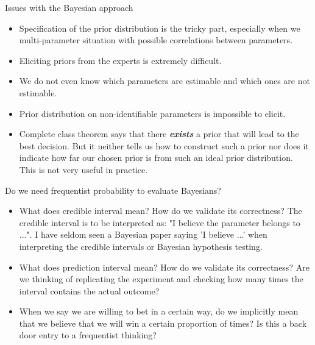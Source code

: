 \documentclass[10pt]{beamer}
\begin{document}
\begin{frame}
\begin{center}
\alert {\LARGE Issues with the Bayesian approach}
\end{center}
\begin{itemize}
\item Specification of the prior distribution is the tricky part, especially when we multi-parameter situation with possible correlations between parameters.
\pause
\item Eliciting priors from the experts is extremely difficult. 
\pause
\item We do not even know which parameters are estimable and which ones are not estimable.
\pause
\item Prior distribution on non-identifiable parameters is impossible to elicit. 
\pause
\item Complete class theorem says that there \emph{\textbf {exists}} a prior that will lead to the best decision. \alert {But it neither tells us how to construct such a prior nor does it indicate how far our chosen prior is from such an ideal prior distribution. This is not very useful in practice.}
\end{itemize}
\end{frame}

\begin{frame}
\begin{center}
\alert {\Large Do we need frequentist probability to evaluate Bayesians?}
\end{center}
\begin{itemize}
\pause
\item What does credible interval mean? How do we validate its correctness? The credible interval is to be interpreted as: "I believe the parameter belongs to ...". I have seldom seen a Bayesian paper saying 'I believe ...' when interpreting the credible intervals or Bayesian hypothesis testing. 
\pause
\item What does prediction interval mean? How do we validate its correctness? Are we thinking of replicating the experiment and checking how many times the interval contains the actual outcome? 
\pause
\item When we say we are willing to bet in a certain way, do we implicitly mean that we believe that we will win a certain proportion of times? Is this a back door entry to a frequentist thinking? 
\end{itemize}
\end{frame}
\end{document}
